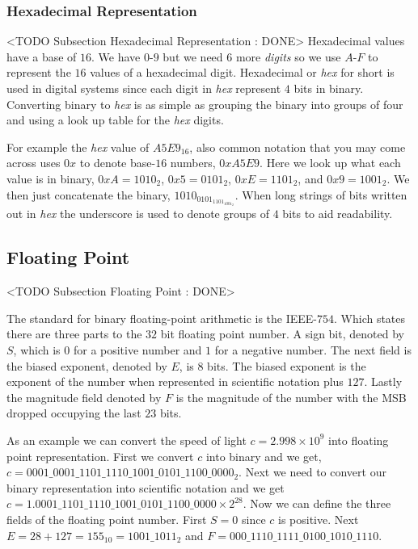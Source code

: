 \subsubsection{Hexadecimal Representation}
	<TODO Subsection Hexadecimal Representation : DONE>
Hexadecimal values have a base of $16$. We have $0$-$9$ but we need $6$ more \emph{digits} so we use $A$-$F$ to represent the $16$ values of a hexadecimal digit. Hexadecimal or \emph{hex} for short is used in digital systems since each digit in \emph{hex} represent $4$ bits in binary. Converting binary to \emph{hex} is as simple as grouping the binary into groups of four and using a look up table for the \emph{hex} digits.
	
For example the \emph{hex} value of $A5E9_{16}$, also common notation that you may come across uses $0x$ to denote base-$16$ numbers, $0xA5E9$. Here we look up what each value is in binary, $0xA=1010_2$, $0x5=0101_2$, $0xE=1101_2$, and $0x9=1001_2$. We then just concatenate the binary, $1010_0101_1101_1001_2$. When long strings of bits written out in \emph{hex} the underscore is used to denote groups of $4$ bits to aid readability.	
		
\subsection{Floating Point}
	<TODO Subsection Floating Point : DONE>
	
The standard for binary floating-point arithmetic is the \ac{IEEE}-$754$. Which states there are three parts to the $32$ bit floating point number. A sign bit, denoted by $S$, which is $0$ for a positive number and $1$ for a negative number. The next field is the biased exponent, denoted by $E$, is $8$ bits. The biased exponent is the exponent of the number when represented in scientific notation plus $127$. Lastly the magnitude field denoted by $F$ is the magnitude of the number with the \ac{MSB} dropped occupying the last $23$ bits.

As an example we can convert the speed of light $c = 2.998 \times 10^9$ into floating point representation. First we convert $c$ into binary and we get, $c=0001\_0001\_1101\_1110\_1001\_0101\_1100\_0000_2$. Next we need to convert our binary representation into scientific notation and we get $c=1.0001\_1101\_1110\_1001\_0101\_1100\_0000 \times 2^{28}$. Now we can define the three fields of the floating point number. First $S=0$ since $c$ is positive. Next $E=28+127=155_{10}=1001\_1011_2$ and $F=000\_1110\_1111\_0100\_1010\_1110$.


